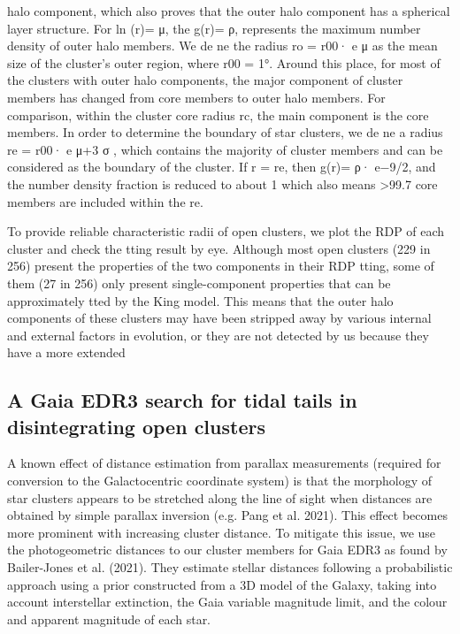 \documentclass[../Main.tex]{subfiles}
\begin{document}
{halo component, which also proves that the outer halo
component has a spherical layer structure.
For ln (r)= μ, the g(r)= ρ, represents the maximum number
density of outer halo members. We de ne the radius
ro
= r00· e μ as the mean size of the cluster’s outer region,
where r00 = 1°. Around this place, for most of the clusters with
outer halo components, the major component of cluster
members has changed from core members to outer halo
members. For comparison, within the cluster core radius rc, the
main component is the core members. In order to determine the
boundary of star clusters, we de ne a radius re
= r00· e μ+3 σ
,
which contains the majority of cluster members and can be
considered as the boundary of the cluster. If r = re, then
g(r)= ρ· e−9/2, and the number density fraction is reduced to
about 1%
which also means >99.7%
core members are included within the re.

To provide reliable characteristic radii of open clusters, we
plot the RDP of each cluster and check the tting result by eye.
Although most open clusters (229 in 256) present the properties
of the two components in their RDP tting, some of them (27
in 256) only present single-component properties that can be
approximately tted by the King model. This means that the
outer halo components of these clusters may have been stripped
away by various internal and external factors in evolution, or
they are not detected by us because they have a more extended

\subsection{A Gaia EDR3 search for tidal tails in disintegrating open clusters}



A known effect of distance estimation from parallax measurements
(required for conversion to the Galactocentric coordinate system) is
that the morphology of star clusters appears to be stretched along
the line of sight when distances are obtained by simple parallax
inversion (e.g. Pang et al. 2021). This effect becomes more prominent
with increasing cluster distance. To mitigate this issue, we use the
photogeometric distances to our cluster members for Gaia EDR3 as
found by Bailer-Jones et al. (2021). They estimate stellar distances
following a probabilistic approach using a prior constructed from a
3D model of the Galaxy, taking into account interstellar extinction,
the Gaia variable magnitude limit, and the colour and apparent
magnitude of each star.

}
\end{document}
